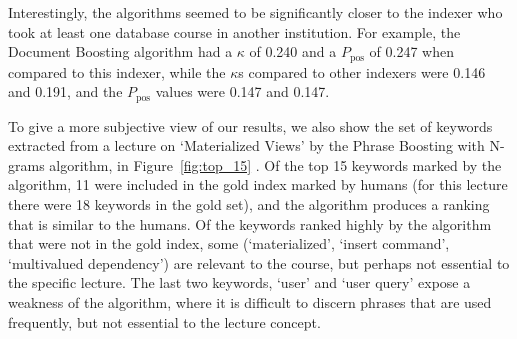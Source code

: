 Interestingly, the algorithms seemed to be significantly closer to the
indexer who took at least one database course in another institution.
For example, the Document Boosting algorithm had a $\kappa$ of 0.240 and
a $P_{\text{pos}}$ of 0.247 when compared to this indexer, while the
$\kappa$s compared to other indexers were 0.146 and 0.191, and the
$P_{\text{pos}}$ values were 0.147 and 0.147.

To give a more subjective view of our results, we also show the set of keywords extracted from a lecture on `Materialized Views' by the Phrase Boosting with N-grams algorithm, in Figure~\ref{fig:top_15} . Of the top 15 keywords marked by the algorithm, 11 were included in the gold index marked by humans (for this lecture there were 18 keywords in the gold set), and the algorithm produces a ranking that is similar to the humans. Of the keywords ranked highly by the algorithm that were not in the gold index, some (`materialized', `insert command', `multivalued dependency') are relevant to the course, but perhaps not essential to the specific lecture. The last two keywords, `user' and `user query' expose a weakness of the algorithm, where it is difficult to discern phrases that are used frequently, but not essential to the lecture concept.
